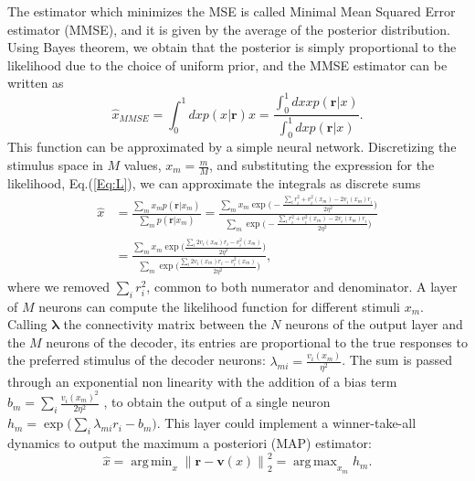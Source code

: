 \documentclass[a4paper]{article}%
\DeclareMathOperator*{\argmin}{arg\,min}
\DeclareMathOperator*{\argmax}{arg\,max}
\begin{document}
The estimator which minimizes the MSE is called Minimal Mean Squared Error
estimator (MMSE), and it is given by the average of the posterior
distribution. Using Bayes theorem, we obtain that the posterior is simply
proportional to the likelihood due to the choice of uniform prior, and the
MMSE estimator can be written as
\begin{equation}
\hat{x}_{MMSE} = \int_{0}^{1} dx p(x| \mathbf{r}) x = \frac{\int_{0}^{1} dx x
p(\mathbf{r}|x)}{\int_{0}^{1} dx p(\mathbf{r}|x)}.
\end{equation}
This function can be approximated by a simple neural network. Discretizing the
stimulus space in $M$ values, $x_{m} = \frac{m}{M}$, and substituting the
expression for the likelihood, Eq.(\ref{Eq:L}), we can approximate the
integrals as discrete sums
\begin{equation}%
\begin{split}
\hat{x}  & = \frac{\sum_{m} x_{m} p(\mathbf{r}|x_{m})}{\sum_{m} p(\mathbf{r}%
|x_{m})} = \frac{\sum_{m} x_{m} \exp{\Big(-\frac{\sum_{i} r_{i}^{2} +
v_{i}^{2}(x_{m}) - 2v_{i}(x_{m})r_{i}}{2\eta^{2}}}\Big)}{\sum_{m}
\exp{\Big(-\frac{\sum_{i} r_{i}^{2} + v_{i}^{2}(x_{m}) - 2v_{i}(x_{m})r_{i}%
}{2\eta^{2}}}\Big)}\\
&  = \frac{\sum_{m} x_{m} \exp{\Big(\frac{\sum_{i} 2v_{i}(x_{m})r_{i}%
-v_{i}^{2}(x_{m}) }{2\eta^{2}}}\Big)}{\sum_{m} \exp{\Big(\frac{\sum_{i}
2v_{i}(x_{m})r_{i}-v_{i}^{2}(x_{m}) }{2\eta^{2}}}\Big)},
\end{split}
\end{equation}
where we removed $\sum_{i} r_{i}^{2} $, common to both numerator and
denominator. A layer of $M$ neurons can compute the likelihood function for
different stimuli $x_{m}$. Calling $\mathbf{\lambda}$ the connectivity matrix
between the $N$ neurons of the output layer and the $M$ neurons of the
decoder, its entries are proportional to the true responses to the preferred
stimulus of the decoder neurons: $\lambda_{mi} = \frac{v_{i}(x_{m})}{\eta^{2}%
}$. The sum is passed through an exponential non linearity with the addition
of a bias term $b_{m} = \sum_{i} \frac{v_{i}(x_{m})^{2}}{2\eta^{2}}$ , to
obtain the output of a single neuron $h_{m} = \exp{\Big(\sum_{i} \lambda
_{mi}r_{i} - b_{m}\Big)}$. This layer could implement a winner-take-all
dynamics to output the maximum a posteriori (MAP) estimator:
\begin{equation}
\hat{x} = \argmin_{x} \left\| \mathbf{r}-\mathbf{v}(x)\right\| _{2}^{2} =
\argmax_{x_{m}}h_{m}.\label{Eq:ML}%
\end{equation}
\end{document}
